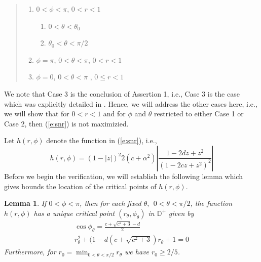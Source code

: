 \documentclass[12pt]{icgft}
\newcommand{\D}{\mathbb D}
\newtheorem{lemma}[theorem]{Lemma}
\theoremstyle{definition}
\numberwithin{equation}{section}
\begin{document}
\vspace{0.05in}

\begin{quote}
\begin{enumerate}
\item[Case 1.] $0 < \phi < \pi$, $0 < r < 1$
\vspace{0.05in}

\begin{enumerate}
\item[Case 1a.] $0< \theta < \theta_0$
\vspace{0.05in}

\item[Case 1b.] $\theta_0 < \theta < \pi/2$
\end{enumerate}
\vspace{0.05in}

\item[Case 2.]  $\phi = \pi$,  $0 < \theta < \pi$,  $0 < r < 1$
\vspace{0.05in}

\item[Case 3.]  $\phi = 0$,  $0 < \theta < \pi$ , $0 \le r < 1$
\end{enumerate}
\end{quote}

\vspace{0.05in}

We note that Case 3 is the conclusion of Assertion 1, i.e., Case 3 is the case
which was explicitly detailed in \cite{BCPW}.  Hence, we will address the other
cases here, i.e., we will show that for $0 < r < 1$ and for $\phi$ and $\theta$ restricted to either
Case 1 or Case 2,  then (\ref{e:snr}) is not maximizied.

Let $h(r,\phi)$ denote the function in (\ref{e:snr}), i.e.,
$$
h(r,\phi) = (1-|z|)^2 2(c+\alpha^2)\left|\frac{1 - 2dz + z^2}{(1-2cz +z^2)^2}\right|
$$
\noindent Before we begin the verification, we will establish the following lemma which gives bounds the location of the critical points of $h(r,\phi)$.

\begin{lemma} \label{lem:r}
If $0 < \phi < \pi$, then for each fixed $\theta, \ \ 0 <\theta < \pi/2$, the
function $h(r,\phi)$ has a unique critical point $(r_{\theta},\phi_{\theta})$ in $\D^+$ given by
\begin{eqnarray} \label{e:critical}
\cos \phi_{\theta} = \frac{c + \sqrt{c^2+3} -d}{2} \\
r_{\theta}^2 + (1 -d(c + \sqrt{c^2+3})r_{\theta} + 1 = 0
\end{eqnarray}
\noindent Furthermore, for $r_0 = \min_{0 < \theta < \pi/2} r_{\theta}$ we have $r_0 \ge 2/5$.
\end{lemma}
\end{document}
